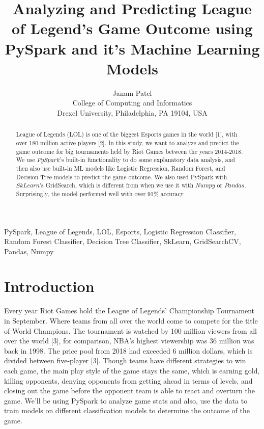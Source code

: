 \documentclass[conference]{IEEEtran}
\begin{document}
\title{
  Analyzing and Predicting League of Legend's Game Outcome using PySpark and it's Machine Learning Models
  }
  
\author{%
Janam Patel \\ 
College of Computing and Informatics\\
Drexel University, Philadelphia, PA 19104, USA}

\maketitle

\begin{abstract}
League of Legends (LOL) is one of the biggest Esports games in the world [1], with over 180 million active players [2]. In this study, we want to analyze and predict the game outcome for big tournaments held by Riot Games between the years 2014-2018. We use $PySpark$’s built-in functionality to do some explanatory data analysis, and then also use built-in ML models like Logistic Regression, Random Forest, and Decision Tree models to predict the game outcome. We also used PySpark with $SkLearn$’s GridSearch, which is different from when we use it with $Numpy$ or $Pandas$. Surprisingly, the model performed well with over 91\% accuracy.\\  
\end{abstract}

\begin{IEEEkeywords}
PySpark, League of Legends, LOL, Esports, Logistic Regression Classifier, Random Forest Classifier, Decision Tree Classifier, SkLearn, GridSearchCV, Pandas, Numpy
\end{IEEEkeywords}

\section{Introduction}
Every year Riot Games hold the League of Legends' Championship Tournament in September. Where teams from all over the world come to compete for the title of World Champions. The tournament is watched by 100 million viewers from all over the world [3], for comparison, NBA's highest viewership was 36 million was back in 1998. The price pool from 2018 had exceeded 6 million dollars, which is divided between five-player [3]. Though teams have different strategies to win each game, the main play style of the game stays the same, which is earning gold, killing opponents, denying opponents from getting ahead in terms of levels, and closing out the game before the opponent team is able to react and overturn the game. We'll be using PySpark to analyze game stats and also, use the data to train models on different classification models to determine the outcome of the game. 
\end{document}
